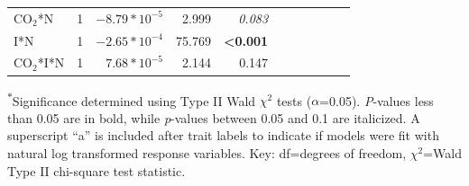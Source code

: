 \begin{landscape}
\begin{table}
{\begin{tabular}{p{3cm}p{0.5cm}p{1.75cm}p{1.5cm}p{1.5cm}p{1.75cm}p{1.5cm}p{1.5cm}p{1.75cm}p{1.5cm}p{1.5cm}}
            CO$_2$*N & \multicolumn{1}{r}{1}
            & \multicolumn{1}{r}{$-8.79*10^{-5}$} & \multicolumn{1}{r}{2.999}   & \multicolumn{1}{r}{\textit{0.083}}
            & \multicolumn{1}{r}{}          & \multicolumn{1}{r}{}          & \multicolumn{1}{r}{}
            & \multicolumn{1}{r}{}          & \multicolumn{1}{r}{}          & \multicolumn{1}{r}{} 
            \\

            I*N & \multicolumn{1}{r}{1}
            & \multicolumn{1}{r}{$-2.65*10^{-4}$} & \multicolumn{1}{r}{75.769}   & \multicolumn{1}{r}{\textbf{<0.001}}
            & \multicolumn{1}{r}{}          & \multicolumn{1}{r}{}          & \multicolumn{1}{r}{}
            & \multicolumn{1}{r}{}          & \multicolumn{1}{r}{}          & \multicolumn{1}{r}{} 
            \\

            CO$_2$*I*N & \multicolumn{1}{r}{1}
            & \multicolumn{1}{r}{$7.68*10^{-5}$}  & \multicolumn{1}{r}{2.144}   & \multicolumn{1}{r}{0.147}
            & \multicolumn{1}{r}{}          & \multicolumn{1}{r}{}          & \multicolumn{1}{r}{}
            & \multicolumn{1}{r}{}          & \multicolumn{1}{r}{}          & \multicolumn{1}{r}{} 
            \\
            \hline
    \end{tabular}}
    \label{tab:table5.1}
    \end{table}
\begin{singlespace}
    \noindent \textsuperscript{$*$}Significance determined using Type II Wald $\chi^{2}$ tests ($\alpha$=0.05). \textit{P}-values less than 0.05 are in bold, while \textit{p}-values between 0.05 and 0.1 are italicized. A superscript “a” is included after trait labels to indicate if models were fit with natural log transformed response variables. Key: df=degrees of freedom, $\chi^2$=Wald Type II chi-square test statistic.
\end{singlespace}
\end{landscape}
\clearpage

